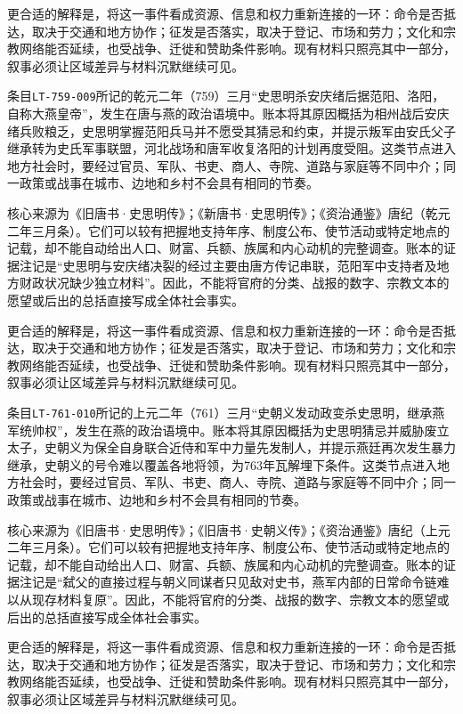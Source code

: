 更合适的解释是，将这一事件看成资源、信息和权力重新连接的一环：命令是否抵达，取决于交通和地方协作；征发是否落实，取决于登记、市场和劳力；文化和宗教网络能否延续，也受战争、迁徙和赞助条件影响。现有材料只照亮其中一部分，叙事必须让区域差异与材料沉默继续可见。

条目\texttt{LT-759-009}所记的乾元二年（759）三月“史思明杀安庆绪后据范阳、洛阳，自称大燕皇帝”，发生在唐与燕的政治语境中。账本将其原因概括为相州战后安庆绪兵败粮乏，史思明掌握范阳兵马并不愿受其猜忌和约束，并提示叛军由安氏父子继承转为史氏军事联盟，河北战场和唐军收复洛阳的计划再度受阻。这类节点进入地方社会时，要经过官员、军队、书吏、商人、寺院、道路与家庭等不同中介；同一政策或战事在城市、边地和乡村不会具有相同的节奏。

核心来源为《旧唐书·史思明传》；《新唐书·史思明传》；《资治通鉴》唐纪（乾元二年三月条）。它们可以较有把握地支持年序、制度公布、使节活动或特定地点的记载，却不能自动给出人口、财富、兵额、族属和内心动机的完整调查。账本的证据注记是“史思明与安庆绪决裂的经过主要由唐方传记串联，范阳军中支持者及地方财政状况缺少独立材料”。因此，不能将官府的分类、战报的数字、宗教文本的愿望或后出的总括直接写成全体社会事实。

更合适的解释是，将这一事件看成资源、信息和权力重新连接的一环：命令是否抵达，取决于交通和地方协作；征发是否落实，取决于登记、市场和劳力；文化和宗教网络能否延续，也受战争、迁徙和赞助条件影响。现有材料只照亮其中一部分，叙事必须让区域差异与材料沉默继续可见。

条目\texttt{LT-761-010}所记的上元二年（761）三月“史朝义发动政变杀史思明，继承燕军统帅权”，发生在燕的政治语境中。账本将其原因概括为史思明猜忌并威胁废立太子，史朝义为保全自身联合近侍和军中力量先发制人，并提示燕廷再次发生暴力继承，史朝义的号令难以覆盖各地将领，为763年瓦解埋下条件。这类节点进入地方社会时，要经过官员、军队、书吏、商人、寺院、道路与家庭等不同中介；同一政策或战事在城市、边地和乡村不会具有相同的节奏。

核心来源为《旧唐书·史思明传》；《旧唐书·史朝义传》；《资治通鉴》唐纪（上元二年三月条）。它们可以较有把握地支持年序、制度公布、使节活动或特定地点的记载，却不能自动给出人口、财富、兵额、族属和内心动机的完整调查。账本的证据注记是“弑父的直接过程与朝义同谋者只见敌对史书，燕军内部的日常命令链难以从现存材料复原”。因此，不能将官府的分类、战报的数字、宗教文本的愿望或后出的总括直接写成全体社会事实。

更合适的解释是，将这一事件看成资源、信息和权力重新连接的一环：命令是否抵达，取决于交通和地方协作；征发是否落实，取决于登记、市场和劳力；文化和宗教网络能否延续，也受战争、迁徙和赞助条件影响。现有材料只照亮其中一部分，叙事必须让区域差异与材料沉默继续可见。

